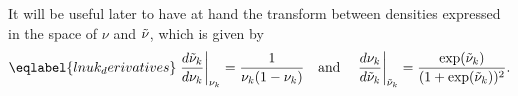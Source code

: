 %
%
%
%
%
%
%
%
It will be useful later to have at hand the transform between densities
expressed in the space of $\nu$ and $\tilde{\nu}$, which is given by
%
\begin{align}\eqlabel{lnuk_derivatives}
%
\fracat{d \lnu_\k}{ d\nuk}{\nuk} ={}
    \frac{1}{\nuk (1 - \nuk)} \mathand
%
\fracat{d \nuk}{ d\lnuk}{\lnuk} ={}
    \frac{\exp(\lnuk)}{(1 + \exp(\lnuk))^2}.
%
\end{align}
